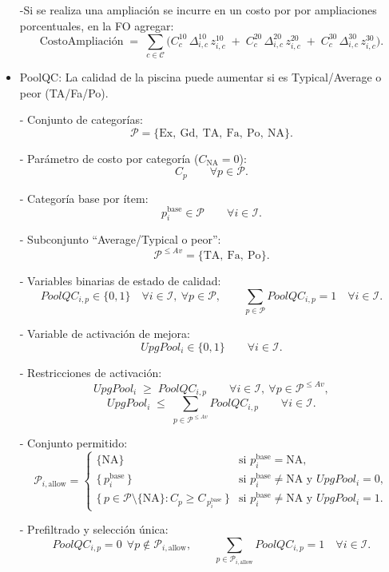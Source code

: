 \begin{itemize}
-Si se realiza una ampliación se incurre en un costo por por ampliaciones porcentuales, en la FO agregar:
\[
\text{CostoAmpliación} \;=\; \sum_{c\in\mathcal{C}}
\Big( C^{10}_{c}\,\Delta^{10}_{i,c}\, z^{10}_{i,c} \;+\; C^{20}_{c}\,\Delta^{20}_{i,c}\, z^{20}_{i,c} \;+\; C^{30}_{c}\,\Delta^{30}_{i,c}\, z^{30}_{i,c} \Big).
\]

    \item PoolQC:  La calidad de la piscina puede aumentar si es Typical/Average o peor (TA/Fa/Po). 

- Conjunto de categorías:
\[
  \mathcal{P} = \{\text{Ex},\ \text{Gd},\ \text{TA},\ \text{Fa},\ \text{Po},\ \text{NA}\}.
\]

- Parámetro de costo por categoría ($C_{\text{NA}}=0$):
\[
  C_p \qquad \forall p \in \mathcal{P}.
\]

- Categoría base por ítem:
\[
  p_i^{\text{base}} \in \mathcal{P} \qquad \forall i \in \mathcal{I}.
\]

- Subconjunto “Average/Typical o peor”:
\[
  \mathcal{P}^{\le Av} = \{\text{TA},\ \text{Fa},\ \text{Po}\}.
\]

- Variables binarias de estado de calidad:
\[
  PoolQC_{i,p} \in \{0,1\} \quad \forall i \in \mathcal{I},\ \forall p \in \mathcal{P},
\qquad
\sum_{p \in \mathcal{P}} PoolQC_{i,p} = 1 \quad \forall i \in \mathcal{I}.
\]

- Variable de activación de mejora:
\[
  UpgPool_i \in \{0,1\} \qquad \forall i \in \mathcal{I}.
\]

- Restricciones de activación:
\[
  UpgPool_i \;\ge\; PoolQC_{i,p} \qquad \forall i \in \mathcal{I},\ \forall p \in \mathcal{P}^{\le Av},
\]
\[
  UpgPool_i \;\le\; \sum_{p \in \mathcal{P}^{\le Av}} PoolQC_{i,p} \qquad \forall i \in \mathcal{I}.
\]

- Conjunto permitido:
\[
  \mathcal{P}_{i,\text{allow}} =
  \begin{cases}
    \{\text{NA}\} & \text{si } p_i^{\text{base}}=\text{NA},\\[4pt]
    \{\, p_i^{\text{base}} \,\} & \text{si } p_i^{\text{base}}\neq \text{NA} \text{ y } UpgPool_i=0,\\[4pt]
    \{\, p \in \mathcal{P}\setminus\{\text{NA}\} : C_p \ge C_{\,p_i^{\text{base}}} \,\} & \text{si } p_i^{\text{base}}\neq \text{NA} \text{ y } UpgPool_i=1.
  \end{cases}
\]

- Prefiltrado y selección única:
\[
  PoolQC_{i,p} = 0 \ \ \forall p \notin \mathcal{P}_{i,\text{allow}}, 
\qquad
\sum_{p \in \mathcal{P}_{i,\text{allow}}} PoolQC_{i,p} = 1 \quad \forall i \in \mathcal{I}.
\]


\end{itemize}
